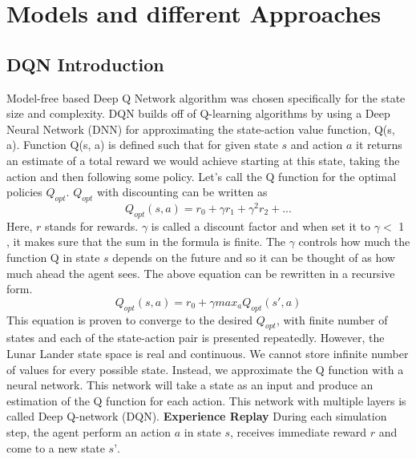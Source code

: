 \section{Models and different Approaches}

\subsection{DQN Introduction}

Model-free based Deep Q Network algorithm was chosen specifically for the state size and complexity. DQN builds off of Q-learning algorithms by using a Deep Neural Network (DNN) for approximating the state-action value function, Q(s, a). Function Q(s, a) is defined such that for given state $s$ and action $a$ it returns an estimate of a total reward we would achieve starting at this state, taking the action and then following some policy. Let’s call the Q function for the optimal policies $Q_{opt}$.
 $Q_{opt}$ with discounting can be written as 
 \begin{equation}
Q_{opt}(s,a) = r_{0} + \gamma r_{1} + \gamma^{2} r_{2} + ...
\end{equation}
Here, $r$ stands for rewards. $\gamma$ is called a discount factor and when set it to $\gamma < $  1 , it makes sure that the sum in the formula is finite. The $\gamma$ controls how much the function Q in state $s$ depends on the future and so it can be thought of as how much ahead the agent sees.  \newline
The above equation can be rewritten in a recursive form.
 \begin{equation}
Q_{opt}(s,a) = r_{0} + \gamma max_{a}Q_{opt}(s',a)
\end{equation}
This equation is proven to converge to the desired $Q_{opt}$, with finite number of states and each of the state-action pair is presented repeatedly. However, the Lunar Lander state space is real and continuous. We cannot store infinite number of values for every possible state. Instead, we  approximate the Q function with a neural network. This network will take a state as an input and produce an estimation of the Q function for each action. This network with multiple layers is called Deep Q-network (DQN).
\newline \newline
\textbf{Experience Replay} \newline \newline
During each simulation step, the agent perform an action $a$ in state $s$, receives immediate reward $r$ and come to a new state $s’$.
